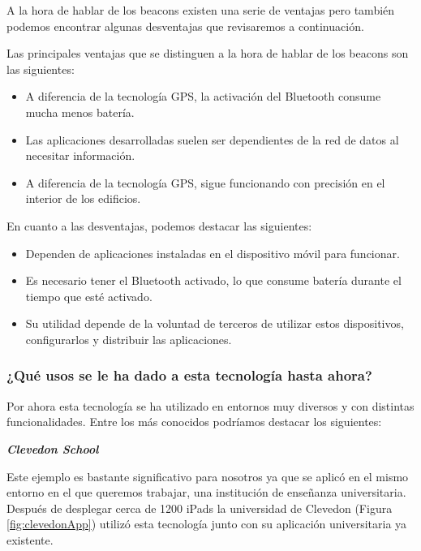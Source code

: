 A la hora de hablar de los beacons existen una serie de ventajas pero también podemos encontrar algunas desventajas que revisaremos a continuación. 

Las principales ventajas que se distinguen a la hora de hablar de los beacons son las siguientes: 

\begin{itemize}
\item A diferencia de la tecnología GPS, la activación del Bluetooth consume mucha menos batería. 
\item Las aplicaciones desarrolladas suelen ser dependientes de la red de datos al necesitar información. 
\item A diferencia de la tecnología GPS, sigue funcionando con precisión en el interior de los edificios.
\end{itemize}

En cuanto a las desventajas, podemos destacar las siguientes:

\begin{itemize}
\item Dependen de aplicaciones instaladas en el dispositivo móvil para funcionar. 
\item Es necesario tener el Bluetooth activado, lo que consume batería durante el tiempo que esté activado. 
\item Su utilidad depende de la voluntad de terceros de utilizar estos dispositivos, configurarlos y distribuir las aplicaciones.
\end{itemize}

\subsubsection{¿Qué usos se le ha dado a esta tecnología hasta ahora?}

Por ahora esta tecnología se ha utilizado en entornos muy diversos y con distintas funcionalidades. Entre los más conocidos podríamos destacar los siguientes: 

\vspace{5mm}

\textsl{\textbf{{Clevedon School}}}

\vspace{2mm}

Este ejemplo es bastante significativo para nosotros ya que se aplicó en el mismo entorno en el que queremos trabajar, una institución de enseñanza universitaria. Después de desplegar cerca de 1200 iPads  la universidad de Clevedon (Figura \ref{fig:clevedonApp}) utilizó esta tecnología junto con su aplicación universitaria ya existente. 

